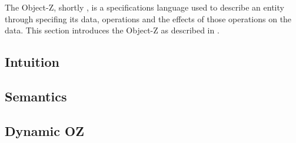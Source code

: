 The Object-Z, shortly \oz{}, is a specifications language used to describe an entity through specifing its data, operations and the effects of those operations on the data. This section introduces the Object-Z as described in \cite{olderog}.
\subsection{Intuition}
\label{sec_oz_intuition}


\subsection{Semantics}
\label{sec_oz_sem}


\subsection{Dynamic OZ}
\label{sec_oz_dynamic_oz}

